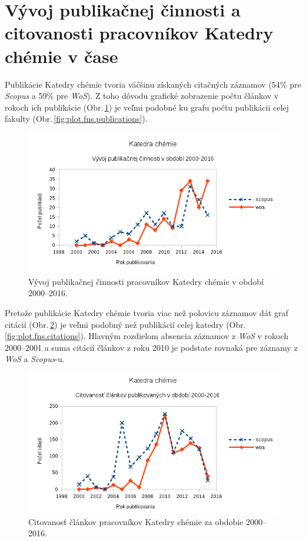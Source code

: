 \section{Vývoj publikačnej činnosti a citovanosti pracovníkov Katedry chémie v
  čase}

Publikácie Katedry chémie tvoria väčšinu získaných citačných záznamov (54\% pre
\emph{Scopus} a 59\% pre \emph{WoS}). Z toho dôvodu grafické zobrazenie počtu
článkov v rokoch ich publikácie (Obr.\,\ref{fig:plot.chem.publications}) je veľmi
  podobné ku grafu počtu publikácii celej fakulty
  (Obr.\,\ref{fig:plot.fns.publications}).

\begin{figure}
  \centering
  \includegraphics[width=\textwidth]{obr/plot-chem-publications.png}
  \caption{Vývoj publikačnej činnosti pracovníkov Katedry chémie v období 2000--2016.}
  \label{fig:plot.chem.publications}
\end{figure}

Pretože publikácie Katedry chémie tvoria viac než polovicu záznamov dát graf
citácií (Obr.\,\ref{fig:plot.chem.citations}) je veľmi podobný než publikácií
celej katedry (Obr.\,\ref{fig:plot.fns.citations}). Hlavným rozdielom absencia
záznamov z \emph{WoS} v rokoch 2000--2001 a suma citácií článkov z roku 2010 je
podstate rovnaká pre záznamy z \emph{WoS} a \emph{Scopus}-u.

\begin{figure}
  \centering
  \includegraphics[width=\textwidth]{obr/plot-chem-citations.png}
  \caption{Citovanosť článkov pracovníkov Katedry chémie za obdobie 2000--2016.}
  \label{fig:plot.chem.citations}
\end{figure}


